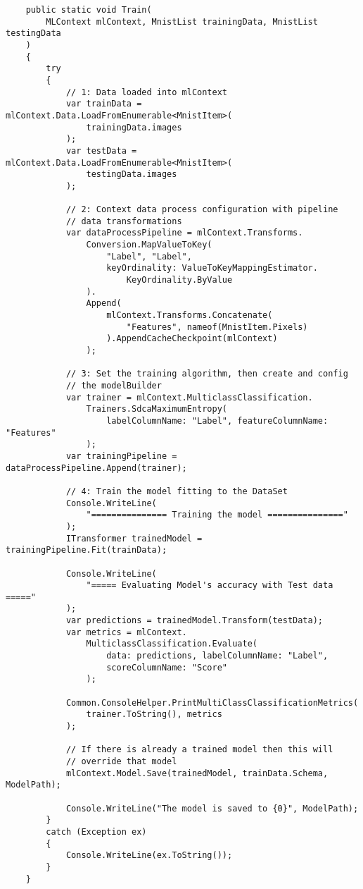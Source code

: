 \begin{verbatim}
    public static void Train(
        MLContext mlContext, MnistList trainingData, MnistList testingData
    )
    {
        try
        {
            // 1: Data loaded into mlContext
            var trainData = mlContext.Data.LoadFromEnumerable<MnistItem>(
                trainingData.images
            );
            var testData = mlContext.Data.LoadFromEnumerable<MnistItem>(
                testingData.images
            );

            // 2: Context data process configuration with pipeline
            // data transformations
            var dataProcessPipeline = mlContext.Transforms.
                Conversion.MapValueToKey(
                    "Label", "Label",
                    keyOrdinality: ValueToKeyMappingEstimator.
                        KeyOrdinality.ByValue
                ).
                Append(
                    mlContext.Transforms.Concatenate(
                        "Features", nameof(MnistItem.Pixels)
                    ).AppendCacheCheckpoint(mlContext)
                );

            // 3: Set the training algorithm, then create and config
            // the modelBuilder
            var trainer = mlContext.MulticlassClassification.
                Trainers.SdcaMaximumEntropy(
                    labelColumnName: "Label", featureColumnName: "Features"
                );
            var trainingPipeline = dataProcessPipeline.Append(trainer);

            // 4: Train the model fitting to the DataSet
            Console.WriteLine(
                "=============== Training the model ==============="
            );
            ITransformer trainedModel = trainingPipeline.Fit(trainData);

            Console.WriteLine(
                "===== Evaluating Model's accuracy with Test data ====="
            );
            var predictions = trainedModel.Transform(testData);
            var metrics = mlContext.
                MulticlassClassification.Evaluate(
                    data: predictions, labelColumnName: "Label",
                    scoreColumnName: "Score"
                );

            Common.ConsoleHelper.PrintMultiClassClassificationMetrics(
                trainer.ToString(), metrics
            );

            // If there is already a trained model then this will
            // override that model
            mlContext.Model.Save(trainedModel, trainData.Schema, ModelPath);

            Console.WriteLine("The model is saved to {0}", ModelPath);
        }
        catch (Exception ex)
        {
            Console.WriteLine(ex.ToString());
        }
    }
\end{verbatim}